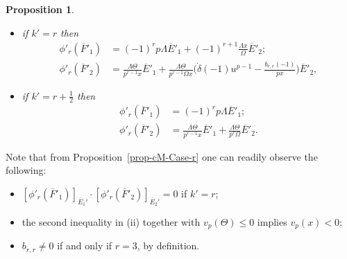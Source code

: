 \documentclass[11pt]{amsart}
\theoremstyle{definition}
\numberwithin{equation}{subsection}
\theoremstyle{plain}
\theoremstyle{plain}
\theoremstyle{plain}
\theoremstyle{plain}
\theoremstyle{plain}
\theoremstyle{plain}
\theoremstyle{plain}
\theoremstyle{plain}
\newtheorem{prop}[equation]{Proposition}
\theoremstyle{plain}
\theoremstyle{plain}
\theoremstyle{plain}
\theoremstyle{plain}
\theoremstyle{definition}
\theoremstyle{definition}
\theoremstyle{definition}
\theoremstyle{remark}
\renewcommand{\(}{\textup{(}}
\renewcommand{\)}{\textup{)}}
\newcommand{\barE}{\overline{E}}
\newcommand{\barF}{\overline{F}}
\begin{document}
\begin{prop}
\begin{itemize}[leftmargin=*]
\item if $k'=r$ then
    \begin{align*}
    \phi'_r(\barF'_1)
        &=(-1)^r p\Lambda\barE'_1+(-1)^{r+1}\frac{\Lambda x}{\Omega}\barE'_2;\\
    \phi'_r(\barF'_2)
        &=\frac{\Lambda \Theta }{p^{r-1}x}\barE'_1+ \frac{\Lambda\Theta}{p^{r-1}\Omega x} \Big(\dot{\delta}(-1)u^{p-1}-\frac{b_{r,r}(-1)}{px}\Big)\barE'_2,
    \end{align*}
\item if $k'=r+\frac{1}{2}$ then
    \begin{align*}
    \phi'_r(\barF'_1)
        &=(-1)^rp\Lambda\barE'_1;\\
    \phi'_r(\barF'_2)
        &=\frac{\Lambda \Theta }{p^{r-1}x}\barE'_1+ \frac{\Lambda\Theta}{p^r\Omega} \barE'_2.
    \end{align*}
\end{itemize}
\end{prop}

Note that from Proposition~\ref{prop-cM-Case-r} one can readily observe the following:
\begin{itemize}[leftmargin=*]
\item $[\phi'_r(\barF'_1)]_{\barE_1'}\cdot [\phi'_r(\barF'_2)]_{\barE_2'}=0$ if $k'=r$;
\item the second inequality in (ii) together with $v_p(\Theta)\leq 0$ implies $v_p(x)<0$;
\item $b_{r,r}\neq 0$ if and only if $r=3$, by definition.
\end{itemize}
\end{document}
